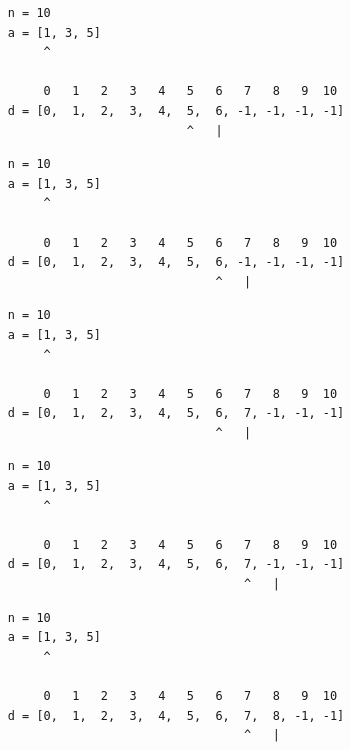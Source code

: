 \begin{frame}[fragile]
\begin{verbatim}
     n = 10
     a = [1, 3, 5]
          ^

          0   1   2   3   4   5   6   7   8   9  10
     d = [0,  1,  2,  3,  4,  5,  6, -1, -1, -1, -1]
                              ^   |
\end{verbatim}
\end{frame}
\addtocounter{framenumber}{-1}

\begin{frame}[fragile]
\begin{verbatim}
     n = 10
     a = [1, 3, 5]
          ^

          0   1   2   3   4   5   6   7   8   9  10
     d = [0,  1,  2,  3,  4,  5,  6, -1, -1, -1, -1]
                                  ^   |
\end{verbatim}
\end{frame}
\addtocounter{framenumber}{-1}

\begin{frame}[fragile]
\begin{verbatim}
     n = 10
     a = [1, 3, 5]
          ^

          0   1   2   3   4   5   6   7   8   9  10
     d = [0,  1,  2,  3,  4,  5,  6,  7, -1, -1, -1]
                                  ^   |
\end{verbatim}
\end{frame}
\addtocounter{framenumber}{-1}

\begin{frame}[fragile]
\begin{verbatim}
     n = 10
     a = [1, 3, 5]
          ^

          0   1   2   3   4   5   6   7   8   9  10
     d = [0,  1,  2,  3,  4,  5,  6,  7, -1, -1, -1]
                                      ^   |
\end{verbatim}
\end{frame}
\addtocounter{framenumber}{-1}

\begin{frame}[fragile]
\begin{verbatim}
     n = 10
     a = [1, 3, 5]
          ^

          0   1   2   3   4   5   6   7   8   9  10
     d = [0,  1,  2,  3,  4,  5,  6,  7,  8, -1, -1]
                                      ^   |
\end{verbatim}
\end{frame}
\addtocounter{framenumber}{-1}

